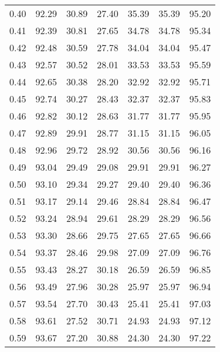 \begin{tabular}{|c|c|c|c|c|c|c|}
      0.40 &     92.29 &     30.89 &      27.40 &   35.39 &      35.39 &         95.20 \\
      0.41 &     92.39 &     30.81 &      27.65 &   34.78 &      34.78 &         95.34 \\
      0.42 &     92.48 &     30.59 &      27.78 &   34.04 &      34.04 &         95.47 \\
      0.43 &     92.57 &     30.52 &      28.01 &   33.53 &      33.53 &         95.59 \\
      0.44 &     92.65 &     30.38 &      28.20 &   32.92 &      32.92 &         95.71 \\
      0.45 &     92.74 &     30.27 &      28.43 &   32.37 &      32.37 &         95.83 \\
      0.46 &     92.82 &     30.12 &      28.63 &   31.77 &      31.77 &         95.95 \\
      0.47 &     92.89 &     29.91 &      28.77 &   31.15 &      31.15 &         96.05 \\
      0.48 &     92.96 &     29.72 &      28.92 &   30.56 &      30.56 &         96.16 \\
      0.49 &     93.04 &     29.49 &      29.08 &   29.91 &      29.91 &         96.27 \\
      0.50 &     93.10 &     29.34 &      29.27 &   29.40 &      29.40 &         96.36 \\
      0.51 &     93.17 &     29.14 &      29.46 &   28.84 &      28.84 &         96.47 \\
      0.52 &     93.24 &     28.94 &      29.61 &   28.29 &      28.29 &         96.56 \\
      0.53 &     93.30 &     28.66 &      29.75 &   27.65 &      27.65 &         96.66 \\
      0.54 &     93.37 &     28.46 &      29.98 &   27.09 &      27.09 &         96.76 \\
      0.55 &     93.43 &     28.27 &      30.18 &   26.59 &      26.59 &         96.85 \\
      0.56 &     93.49 &     27.96 &      30.28 &   25.97 &      25.97 &         96.94 \\
      0.57 &     93.54 &     27.70 &      30.43 &   25.41 &      25.41 &         97.03 \\
      0.58 &     93.61 &     27.52 &      30.71 &   24.93 &      24.93 &         97.12 \\
      0.59 &     93.67 &     27.20 &      30.88 &   24.30 &      24.30 &         97.22 \\

\end{tabular}
